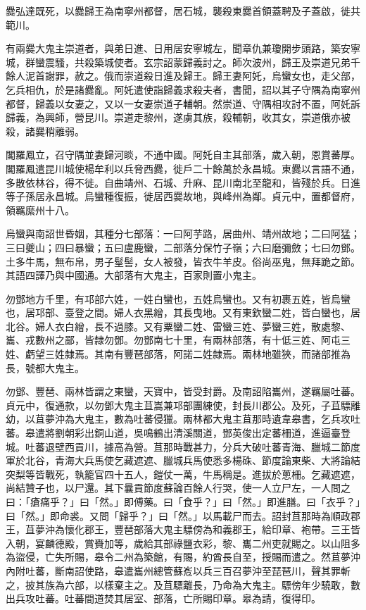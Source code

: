 \begin{pinyinscope}
 爨弘達既死，以爨歸王為南寧州都督，居石城，襲殺東爨首領蓋聘及子蓋啟，徙共範川。



 有兩爨大鬼主崇道者，與弟日進、日用居安寧城左，聞章仇兼瓊開步頭路，築安寧城，群蠻震騷，共殺築城使者。玄宗詔蒙歸義討之。師次波州，歸王及崇道兄弟千餘人泥首謝罪，赦之。俄而崇道殺日進及歸王。歸王妻阿奼，烏蠻女也，走父部，乞兵相仇，於是諸爨亂。阿奼遣使詣歸義求殺夫者，書聞，詔以其子守隅為南寧州都督，歸義以女妻之，又以一女妻崇道子輔朝。然崇道、守隅相攻討不置，阿奼訴歸義，為興師，營昆川。崇道走黎州，遂虜其族，殺輔朝，收其女，崇道俄亦被殺，諸爨稍離弱。



 閣羅鳳立，召守隅並妻歸河睒，不通中國。阿奼自主其部落，歲入朝，恩賞蕃厚。閣羅鳳遣昆川城使楊牟利以兵脅西爨，徙戶二十餘萬於永昌城。東爨以言語不通，多散依林谷，得不徙。自曲靖州、石城、升麻、昆川南北至龍和，皆殘於兵。日進等子孫居永昌城。烏蠻種復振，徙居西爨故地，與峰州為鄰。貞元中，置都督府，領羈縻州十八。



 烏蠻與南詔世昏姻，其種分七部落：一曰阿芋路，居曲州、靖州故地；二曰阿猛；三曰夔山；四曰暴蠻；五曰盧鹿蠻，二部落分保竹子嶺；六曰磨彌斂；七曰勿鄧。土多牛馬，無布帛，男子髽髻，女人被發，皆衣牛羊皮。俗尚巫鬼，無拜跪之節。其語四譯乃與中國通。大部落有大鬼主，百家則置小鬼主。



 勿鄧地方千里，有邛部六姓，一姓白蠻也，五姓烏蠻也。又有初裹五姓，皆烏蠻也，居邛部、臺登之間。婦人衣黑繒，其長曳地。又有東欽蠻二姓，皆白蠻也，居北谷。婦人衣白繒，長不過膝。又有粟蠻二姓、雷蠻三姓、夢蠻三姓，散處黎、巂、戎數州之鄙，皆隸勿鄧。勿鄧南七十里，有兩林部落，有十低三姓、阿屯三姓、虧望三姓隸焉。其南有豐琶部落，阿諾二姓隸焉。兩林地雖狹，而諸部推為長，號都大鬼主。



 勿鄧、豐琶、兩林皆謂之東蠻，天寶中，皆受封爵。及南詔陷巂州，遂羈屬吐蕃。貞元中，復通款，以勿鄧大鬼主苴嵩兼邛部團練使，封長川郡公。及死，子苴驃離幼，以苴夢沖為大鬼主，數為吐蕃侵獵。兩林都大鬼主苴那時遺韋皋書，乞兵攻吐蕃。皋遣將劉朝彩出銅山道，吳鳴鶴出清溪關道，鄧英俊出定蕃柵道，進逼臺登城。吐蕃退壁西貢川，據高為營。苴那時戰甚力，分兵大破吐蕃青海、臘城二節度軍於北谷，青海大兵馬使乞藏遮遮、臘城兵馬使悉多楊硃、節度論東柴、大將論結突梨等皆戰死，執籠官四十五人，鎧仗一萬，牛馬稱是。進拔於蔥柵。乞藏遮遮，尚結贊子也，以尸還。其下曩貢節度蘇論百餘人行哭，使一人立尸左，一人問之曰：「瘡痛乎？」曰「然。」即傅藥。曰「食乎？」曰「然。」即進膳。曰「衣乎？」曰「然。」即命裘。又問「歸乎？」曰「然。」以馬載尸而去。詔封苴那時為順政郡王，苴夢沖為懷化郡王，豐琶部落大鬼主驃傍為和義郡王，給印章、袍帶。三王皆入朝，宴麟德殿，賞賚加等，歲給其部祿鹽衣彩，黎、巂二州吏就賜之。以山阻多為盜侵，亡失所賜，皋令二州為築館，有賜，約酋長自至，授賜而遣之。然苴夢沖內附吐蕃，斷南詔使路，皋遣巂州總管蘇峞以兵三百召夢沖至琵琶川，聲其罪斬之，披其族為六部，以樣棄主之。及苴驃離長，乃命為大鬼主。驃傍年少驍敢，數出兵攻吐蕃。吐蕃間道焚其居室、部落，亡所賜印章。皋為請，復得印。




\end{pinyinscope}
